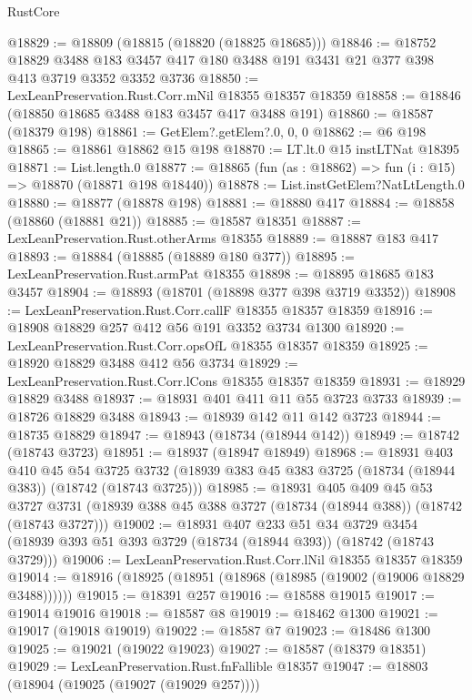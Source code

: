 \begin{lexlean}{RustCore}
\begin{coremodule}
@18829 := @18809 (@18815 (@18820 (@18825 @18685)))
@18846 := @18752
    @18829
    @3488
    @183
    @3457
    @417
    @180
    @3488
    @191
    @3431
    @21
    @377
    @398
    @413
    @3719
    @3352
    @3352
    @3736
@18850 := LexLeanPreservation.Rust.Corr.mNil @18355 @18357 @18359
@18858 := @18846 (@18850 @18685 @3488 @183 @3457 @417 @3488 @191)
@18860 := @18587 (@18379 @198)
@18861 := GetElem?.getElem?.{0, 0, 0}
@18862 := @6 @198
@18865 := @18861 @18862 @15 @198
@18870 := LT.lt.{0} @15 instLTNat @18395
@18871 := List.length.{0}
@18877 := @18865 (fun (as : @18862) => fun (i : @15) => @18870 (@18871 @198 @18440))
@18878 := List.instGetElem?NatLtLength.{0}
@18880 := @18877 (@18878 @198)
@18881 := @18880 @417
@18884 := @18858 (@18860 (@18881 @21))
@18885 := @18587 @18351
@18887 := LexLeanPreservation.Rust.otherArms @18355
@18889 := @18887 @183 @417
@18893 := @18884 (@18885 (@18889 @180 @377))
@18895 := LexLeanPreservation.Rust.armPat @18355
@18898 := @18895 @18685 @183 @3457
@18904 := @18893 (@18701 (@18898 @377 @398 @3719 @3352))
@18908 := LexLeanPreservation.Rust.Corr.callF @18355 @18357 @18359
@18916 := @18908 @18829 @257 @412 @56 @191 @3352 @3734 @1300
@18920 := LexLeanPreservation.Rust.Corr.opsOfL @18355 @18357 @18359
@18925 := @18920 @18829 @3488 @412 @56 @3734
@18929 := LexLeanPreservation.Rust.Corr.lCons @18355 @18357 @18359
@18931 := @18929 @18829 @3488
@18937 := @18931 @401 @411 @11 @55 @3723 @3733
@18939 := @18726 @18829 @3488
@18943 := @18939 @142 @11 @142 @3723
@18944 := @18735 @18829
@18947 := @18943 (@18734 (@18944 @142))
@18949 := @18742 (@18743 @3723)
@18951 := @18937 (@18947 @18949)
@18968 := @18931
    @403
    @410
    @45
    @54
    @3725
    @3732
    (@18939 @383 @45 @383 @3725 (@18734 (@18944 @383)) (@18742 (@18743 @3725)))
@18985 := @18931
    @405
    @409
    @45
    @53
    @3727
    @3731
    (@18939 @388 @45 @388 @3727 (@18734 (@18944 @388)) (@18742 (@18743 @3727)))
@19002 := @18931
    @407
    @233
    @51
    @34
    @3729
    @3454
    (@18939 @393 @51 @393 @3729 (@18734 (@18944 @393)) (@18742 (@18743 @3729)))
@19006 := LexLeanPreservation.Rust.Corr.lNil @18355 @18357 @18359
@19014 := @18916 (@18925 (@18951 (@18968 (@18985 (@19002 (@19006 @18829 @3488))))))
@19015 := @18391 @257
@19016 := @18588 @19015
@19017 := @19014 @19016
@19018 := @18587 @8
@19019 := @18462 @1300
@19021 := @19017 (@19018 @19019)
@19022 := @18587 @7
@19023 := @18486 @1300
@19025 := @19021 (@19022 @19023)
@19027 := @18587 (@18379 @18351)
@19029 := LexLeanPreservation.Rust.fnFallible @18357
@19047 := @18803
    (@18904 (@19025 (@19027 (@19029 @257))))

\end{coremodule}
\end{lexlean}
